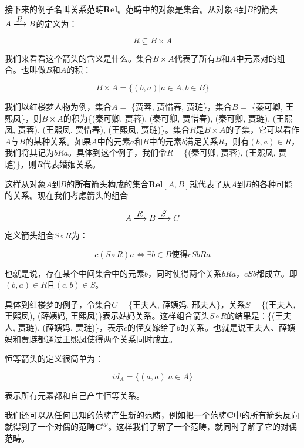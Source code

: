 \documentclass{article}
\begin{document}
\begin{example}
接下来的例子名叫关系范畴$\pmb{Rel}$。范畴中的对象是集合。从对象$A$到$B$的箭头$A \arrowto{R} B$的定义为：

\[
R \subseteq B \times A
\]

我们来看看这个箭头的含义是什么。集合$B \times A$代表了所有$B$和$A$中元素对的组合。也叫做$B$和$A$的积：

\[
B \times A = \{(b, a) | a \in A, b \in B\}
\]

我们以红楼梦人物为例，集合$A =$ \{贾蓉, 贾惜春, 贾琏\}，集合$B =$ \{秦可卿, 王熙凤\}，则$B \times A$的积为\{(秦可卿, 贾蓉), (秦可卿, 贾惜春), (秦可卿, 贾琏), (王熙凤, 贾蓉), (王熙凤, 贾惜春), (王熙凤, 贾琏)\}。集合$R$是$B \times A$的子集，它可以看作$A$与$B$的某种关系。如果$A$中的元素$a$和$B$中的元素$b$满足关系$R$，则有$(b, a) \in R$，我们将其记为$bRa$。具体到这个例子，我们令$R=$\{(秦可卿, 贾蓉), (王熙凤, 贾琏)\}，则$R$代表婚姻关系。

这样从对象$A$到$B$的\textbf{所有}箭头构成的集合$\pmb{Rel}[A, B]$就代表了从$A$到$B$的各种可能的关系。现在我们考虑箭头的组合

\[
A \arrowto{R} B \arrowto{S} C
\]

定义箭头组合$S \circ R$为：

\[
c (S \circ R) a \iff \exists b \in B \text{使得} cSbRa
\]

也就是说，存在某个中间集合中的元素$b$，同时使得两个关系$bRa$，$cSb$都成立。即$(b, a) \in R$且$(c, b) \in S$。

具体到红楼梦的例子，令集合$C=$\{王夫人, 薛姨妈, 邢夫人\}，关系$S=$\{(王夫人, 王熙凤), (薛姨妈, 王熙凤)\}表示姑妈关系。这样组合箭头$S \circ R$的结果是：\{(王夫人, 贾琏), (薛姨妈, 贾琏)\}，表示$c$的侄女嫁给了$b$的关系。也就是说王夫人、薛姨妈和贾琏都通过王熙凤使得两个关系同时成立。

恒等箭头的定义很简单为：

\[
id_A = \{(a, a) | a \in A\}
\]

表示所有元素都和自己产生恒等关系。
\end{example}

我们还可以从任何已知的范畴产生新的范畴，例如把一个范畴$\pmb{C}$中的所有箭头反向就得到了一个对偶的范畴$\pmb{C}^{op}$。这样我们了解了一个范畴，就同时了解了它的对偶范畴。

\begin{Exercise}
\end{Exercise}
\end{document}
